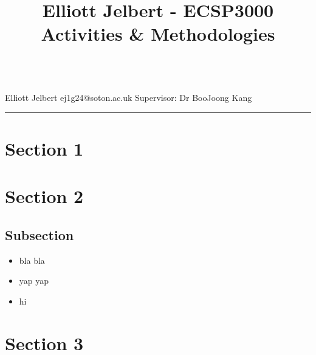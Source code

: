 \documentclass[12pt, a4paper]{article}
\title{\textbf{Elliott Jelbert - ECSP3000 Activities \& Methodologies}}
\date{}
\begin{document}
\\[10pt]
{\small Elliott Jelbert \quad ej1g24@soton.ac.uk \quad Supervisor: Dr BooJoong Kang}
\vspace{15pt}
\hrule

\section*{Section 1}
\section*{Section 2}
\subsection*{Subsection}
\begin{itemize}[noitemsep]
    \item bla bla 
    \item yap yap
    \item hi
\end{itemize}

\section*{Section 3}
\end{document}
